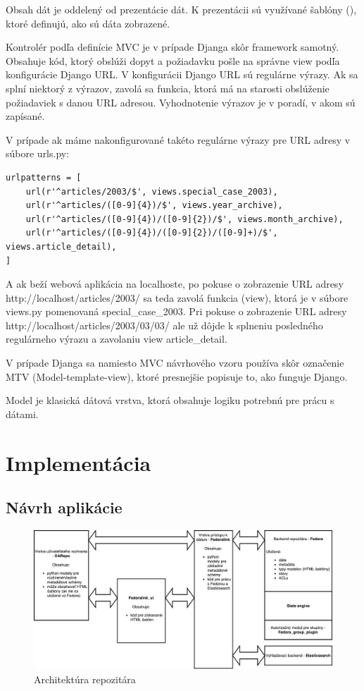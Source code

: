\documentclass[thesis=M,slovak]{FITthesis}[2013/05/06]
\begin{document}
Obsah dát je oddelený od prezentácie dát. K prezentácii sú využívané šablóny (), ktoré definujú, ako sú dáta zobrazené.

Kontrolér podľa definície MVC je v prípade Djanga skôr framework samotný. Obsahuje kód, ktorý obslúži dopyt a požiadavku pošle na správne view podľa konfigurácie Django URL. V konfigurácii Django URL sú regulárne výrazy. Ak sa splní niektorý z výrazov, zavolá sa funkcia, ktorá má na starosti obslúženie požiadaviek s danou URL adresou. Vyhodnotenie výrazov je v poradí, v akom sú zapísané.

V prípade ak máme nakonfigurované takéto regulárne výrazy pre URL adresy v súbore urls.py:
\begin{lstlisting}[frame=single] 
urlpatterns = [
    url(r'^articles/2003/$', views.special_case_2003),
    url(r'^articles/([0-9]{4})/$', views.year_archive),
    url(r'^articles/([0-9]{4})/([0-9]{2})/$', views.month_archive),
    url(r'^articles/([0-9]{4})/([0-9]{2})/([0-9]+)/$', views.article_detail),
]
\end{lstlisting}
A ak beží webová aplikácia na localhoste, po pokuse o zobrazenie URL adresy http://localhost/articles/2003/ sa teda zavolá funkcia (view), ktorá je v súbore views.py pomenovaná special\_case\_2003. Pri pokuse o zobrazenie URL adresy http://localhost/articles/2003/03/03/ ale už dôjde k splneniu posledného regulárneho výrazu a zavolaniu view article\_detail.

V prípade Djanga sa namiesto MVC návrhového vzoru používa skôr označenie MTV (Model-template-view), ktoré presnejšie popisuje to, ako funguje Django. \cite{DjangoFAQ}

Model je klasická dátová vrstva, ktorá obsahuje logiku potrebnú pre prácu s dátami.

\chapter{Implementácia}
\section{Návrh aplikácie}
\begin{figure}\centering
	\includegraphics[width=1.0\textwidth]{diagramy/Architektura_repozitara.pdf}
 	\caption[Architektúra repozitára]{Architektúra repozitára}\label{graphics:architektura_repozitara}
\end{figure}
\end{document}
